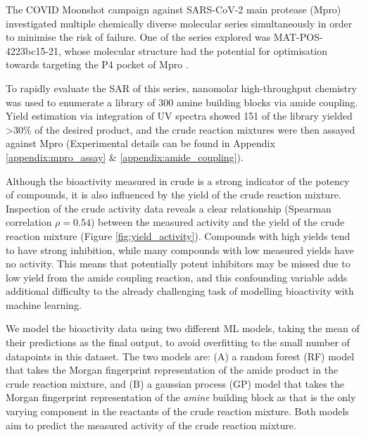The COVID Moonshot campaign \cite{Moonshot2022} against SARS-CoV-2 main protease (Mpro) investigated multiple chemically diverse molecular series simultaneously in order to minimise the risk of failure. One of the series explored was MAT-POS-4223bc15-21, whose molecular structure had the potential for optimisation towards targeting the P4 pocket of Mpro \cite{Moonshot2022}. 

To rapidly evaluate the SAR of this series, nanomolar high-throughput chemistry was used to enumerate a library of 300 amine building blocks via amide coupling. Yield estimation via integration of UV spectra showed 151 of the library yielded >30\% of the desired product, and the crude reaction mixtures were then assayed against Mpro (Experimental details can be found in Appendix \ref{appendix:mpro_assay} \& \ref{appendix:amide_coupling}).

Although the bioactivity measured in crude is a strong indicator of the potency of compounds, it is also influenced by the yield of the crude reaction mixture. Inspection of the crude activity data reveals a clear relationship (Spearman correlation $\rho = 0.54$) between the measured activity and the yield of the crude reaction mixture (Figure \ref{fig:yield_activity}). Compounds with high yields tend to have strong inhibition, while many compounds with low measured yields have no activity. This means that potentially potent inhibitors may be missed due to low yield from the amide coupling reaction, and this confounding variable adds additional difficulty to the already challenging task of modelling bioactivity with machine learning. 

We model the bioactivity data using two different ML models, taking the mean of their predictions as the final output, to avoid overfitting to the small number of datapoints in this dataset. The two models are: (A) a random forest (RF) model that takes the Morgan fingerprint representation of the amide product in the crude reaction mixture, and (B) a gaussian process (GP) model that takes the Morgan fingerprint representation of the \textit{amine} building block as that is the only varying component in the reactants of the crude reaction mixture. Both models aim to predict the measured activity of the crude reaction mixture.

